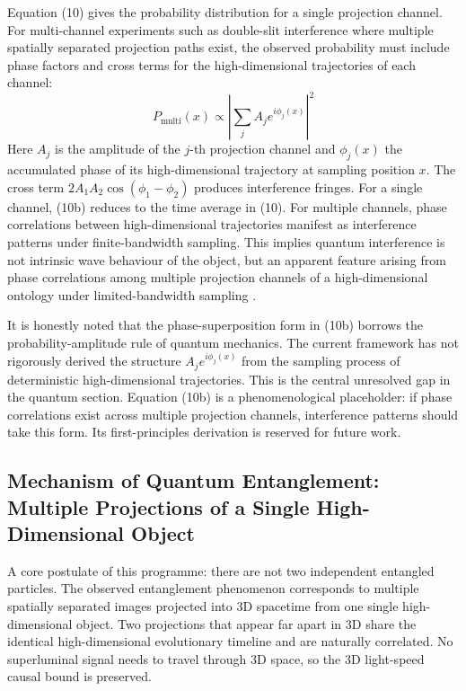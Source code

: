 \documentclass[12pt,a4paper]{article}
\begin{document}
Equation (10) gives the probability distribution for a single projection channel. For multi-channel experiments such as double-slit interference where multiple spatially separated projection paths exist, the observed probability must include phase factors and cross terms for the high-dimensional trajectories of each channel:
\begin{equation*}
P_{\text{multi}}(x) \propto \left| \sum_{j} A_j e^{i \phi_j(x)} \right|^2 \tag{10b}
\end{equation*}
Here $A_j$ is the amplitude of the $j$-th projection channel and $\phi_j(x)$ the accumulated phase of its high-dimensional trajectory at sampling position $x$. The cross term $2A_1 A_2 \cos(\phi_1 - \phi_2)$ produces interference fringes. For a single channel, (10b) reduces to the time average in (10). For multiple channels, phase correlations between high-dimensional trajectories manifest as interference patterns under finite-bandwidth sampling. This implies quantum interference is not intrinsic wave behaviour of the object, but an apparent feature arising from phase correlations among multiple projection channels of a high-dimensional ontology under limited-bandwidth sampling \cite{feynman1963, wheeler1983}.

It is honestly noted that the phase-superposition form in (10b) borrows the probability-amplitude rule of quantum mechanics. The current framework has not rigorously derived the structure $A_j e^{i\phi_j(x)}$ from the sampling process of deterministic high-dimensional trajectories. This is the central unresolved gap in the quantum section. Equation (10b) is a phenomenological placeholder: if phase correlations exist across multiple projection channels, interference patterns should take this form. Its first-principles derivation is reserved for future work.

\subsection{Mechanism of Quantum Entanglement: Multiple Projections of a Single High-Dimensional Object}
A core postulate of this programme: there are not two independent entangled particles. The observed entanglement phenomenon corresponds to multiple spatially separated images projected into 3D spacetime from one single high-dimensional object. Two projections that appear far apart in 3D share the identical high-dimensional evolutionary timeline and are naturally correlated. No superluminal signal needs to travel through 3D space, so the 3D light-speed causal bound is preserved.
\end{document}
